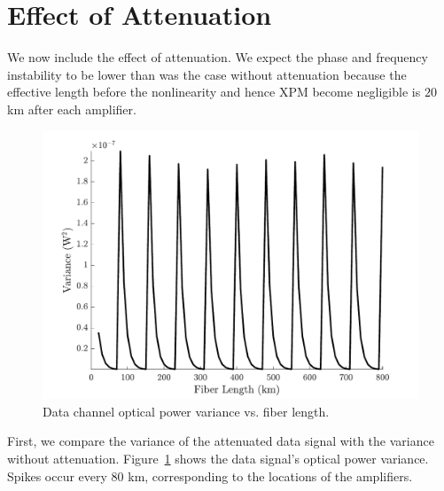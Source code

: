 \clearpage

\section{Effect of Attenuation}

We now include the effect of attenuation. We expect the phase and frequency instability to be lower than was the case without attenuation because the effective length before the nonlinearity and hence XPM become negligible is $20$ km after each amplifier.

%
\begin{figure}[htb]
	\raggedright
	\includegraphics[scale=0.8]{img/ACalcVar}
	\renewcommand{\baselinestretch}{1}
	\small\normalsize
	\caption{Data channel optical power variance vs. fiber length.} \label{fig:ACalcVar}
\end{figure}
\renewcommand{\baselinestretch}{2}
\small\normalsize

First, we compare the variance of the attenuated data signal with the variance without attenuation. Figure~\ref{fig:ACalcVar} shows the data signal's optical power variance. Spikes occur every $80$ km, corresponding to the locations of the amplifiers.

